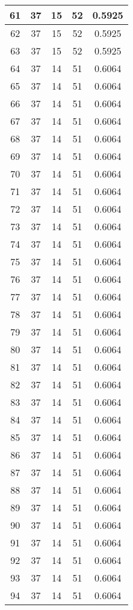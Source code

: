\documentclass[letterpaper, 12pt]{article}
\begin{document}
\begin{longtable}{|c|c|c|c|c|}
61 & 37 & 15 & 52 & 0.5925 \\
\hline
62 & 37 & 15 & 52 & 0.5925 \\
\hline
63 & 37 & 15 & 52 & 0.5925 \\
\hline
64 & 37 & 14 & 51 & 0.6064 \\
\hline
65 & 37 & 14 & 51 & 0.6064 \\
\hline
66 & 37 & 14 & 51 & 0.6064 \\
\hline
67 & 37 & 14 & 51 & 0.6064 \\
\hline
68 & 37 & 14 & 51 & 0.6064 \\
\hline
69 & 37 & 14 & 51 & 0.6064 \\
\hline
70 & 37 & 14 & 51 & 0.6064 \\
\hline
71 & 37 & 14 & 51 & 0.6064 \\
\hline
72 & 37 & 14 & 51 & 0.6064 \\
\hline
73 & 37 & 14 & 51 & 0.6064 \\
\hline
74 & 37 & 14 & 51 & 0.6064 \\
\hline
75 & 37 & 14 & 51 & 0.6064 \\
\hline
76 & 37 & 14 & 51 & 0.6064 \\
\hline
77 & 37 & 14 & 51 & 0.6064 \\
\hline
78 & 37 & 14 & 51 & 0.6064 \\
\hline
79 & 37 & 14 & 51 & 0.6064 \\
\hline
80 & 37 & 14 & 51 & 0.6064 \\
\hline
81 & 37 & 14 & 51 & 0.6064 \\
\hline
82 & 37 & 14 & 51 & 0.6064 \\
\hline
83 & 37 & 14 & 51 & 0.6064 \\
\hline
84 & 37 & 14 & 51 & 0.6064 \\
\hline
85 & 37 & 14 & 51 & 0.6064 \\
\hline
86 & 37 & 14 & 51 & 0.6064 \\
\hline
87 & 37 & 14 & 51 & 0.6064 \\
\hline
88 & 37 & 14 & 51 & 0.6064 \\
\hline
89 & 37 & 14 & 51 & 0.6064 \\
\hline
90 & 37 & 14 & 51 & 0.6064 \\
\hline
91 & 37 & 14 & 51 & 0.6064 \\
\hline
92 & 37 & 14 & 51 & 0.6064 \\
\hline
93 & 37 & 14 & 51 & 0.6064 \\
\hline
94 & 37 & 14 & 51 & 0.6064 \\

\end{longtable}
\end{document}
